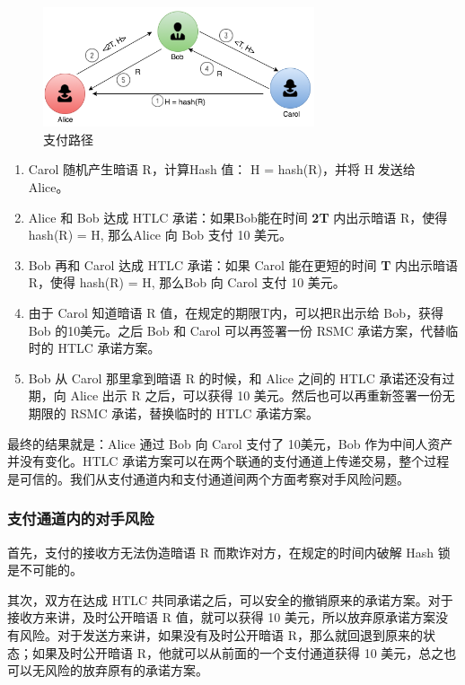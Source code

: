 \begin{figure}[h!]
    \centering
    \includegraphics[width=8cm, keepaspectratio]{../images/payment_path.png}
    \caption{支付路径}
    \label{fig:htlc_path}
\end{figure}

\begin{enumerate}
    \item Carol 随机产生暗语 R，计算Hash 值： H = hash(R)，并将 H 发送给 Alice。
    \item Alice 和 Bob 达成 HTLC 承诺：如果Bob能在时间 \textbf{2T} 内出示暗语 R，使得 hash(R) = H, 那么Alice 向 Bob 支付 10 美元。
    \item Bob 再和 Carol 达成 HTLC 承诺：如果 Carol 能在更短的时间 \textbf{T} 内出示暗语 R，使得 hash(R) = H, 那么Bob 向 Carol 支付 10 美元。
    \item 由于 Carol 知道暗语 R 值，在规定的期限T内，可以把R出示给 Bob，获得 Bob 的10美元。之后 Bob 和 Carol 可以再签署一份 RSMC 承诺方案，代替临时的 HTLC 承诺方案。
    \item Bob 从 Carol 那里拿到暗语 R 的时候，和 Alice 之间的 HTLC 承诺还没有过期，向 Alice 出示 R 之后，可以获得 10 美元。然后也可以再重新签署一份无期限的 RSMC 承诺，替换临时的 HTLC 承诺方案。
\end{enumerate}

最终的结果就是：Alice 通过 Bob 向 Carol 支付了 10美元，Bob 作为中间人资产并没有变化。HTLC 承诺方案可以在两个联通的支付通道上传递交易，整个过程是可信的。我们从支付通道内和支付通道间两个方面考察对手风险问题。

\subsubsection{支付通道内的对手风险}
首先，支付的接收方无法伪造暗语 R 而欺诈对方，在规定的时间内破解 Hash 锁是不可能的。

其次，双方在达成 HTLC 共同承诺之后，可以安全的撤销原来的承诺方案。对于接收方来讲，及时公开暗语 R 值，就可以获得 10 美元，所以放弃原承诺方案没有风险。对于发送方来讲，如果没有及时公开暗语 R，那么就回退到原来的状态；如果及时公开暗语 R，他就可以从前面的一个支付通道获得 10 美元，总之也可以无风险的放弃原有的承诺方案。

